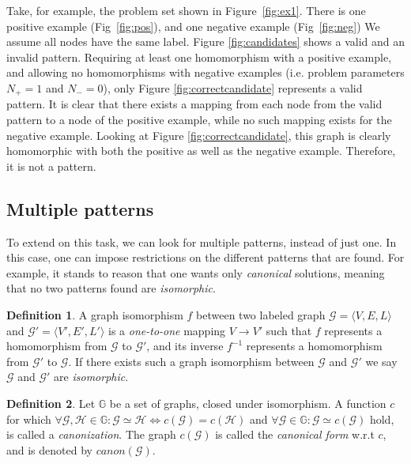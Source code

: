 \documentclass{article}
\theoremstyle{definition}
\newtheorem{definition}{Definition}[section]
\newcommand{\triple}[1]{\ensuremath{\langle #1 \rangle}}
\newcommand{\graph}[1]{\ensuremath{\mathcal{#1}}}
\newcommand{\graphset}[1]{\ensuremath{\mathbb{#1}}}
\begin{document}
Take, for example, the problem set shown in Figure~\ref{fig:ex1}.
There is one positive example (Fig~\ref{fig:pos}), and one negative example (Fig~\ref{fig:neg})
We assume all nodes have the same label.
Figure \ref{fig:candidates} shows a valid and an invalid pattern.
Requiring at least one homomorphism with a positive example, and allowing no homomorphisms with negative examples (i.e. problem parameters $N_{+}=1$ and $N_{-}=0$), only Figure \ref{fig:correctcandidate} represents a valid pattern.
It is clear that there exists a mapping from each node from the valid pattern to a node of the positive example, while no such mapping exists for the negative example.
Looking at Figure \ref{fig:correctcandidate}, this graph is clearly homomorphic with both the positive as well as the negative example. Therefore, it is not a pattern.

\subsection{Multiple patterns}
To extend on this task, we can look for multiple patterns, instead of just one.
In this case, one can impose restrictions on the different patterns that are found.
For example, it stands to reason that one wants only \emph{canonical} solutions, meaning that no two patterns found are \emph{isomorphic}.

\begin{definition}
  \label{def:isomorphism}
  A graph isomorphism $f$ between two labeled graph $\graph{G} = \triple{V,E,L}$ and $\graph{G'} = \triple{V',E',L'}$ is a \emph{one-to-one} mapping $V \rightarrow V'$ 
  such that $f$ represents a homomorphism from $\graph{G}$ to $\graph{G'}$,
  and its inverse $f^{-1}$ represents a homomorphism from $\graph{G'}$ to $\graph{G}$.
  If there exists such a graph isomorphism between $\graph{G}$ and $\graph{G'}$ we say $\graph{G}$ and $\graph{G'}$ are \emph{isomorphic}.
\end{definition}


\begin{definition}
  \label{def:canonicalForm}
  Let $\graphset{G}$ be a set of graphs, closed under isomorphism.
  A function $c$ for which $\forall \graph{G,H} \in \graphset{G} : \graph{G} \simeq \graph{H} \iff c(\graph{G}) = c(\graph{H})$ and $\forall \graph{G} \in \graphset{G} : \graph{G} \simeq c(\graph{G})$ hold, is called a \emph{canonization}.
  The graph $c(\graph{G})$ is called the \emph{canonical form} w.r.t $c$, and is denoted by $\mathit{canon}(\graph{G})$.
\end{definition}
\end{document}
